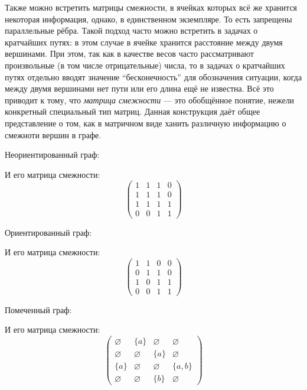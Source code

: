 Также можно встретить матрицы смежности, в ячейках которых всё же хранится некоторая информация, однако, в единственном экземпляре. То есть запрещены параллельные рёбра.
Такой подход часто можно встретить в задачах о кратчайших путях: в этом случае в ячейке хранится расстояние между двумя вершинами.
При этом, так как в качестве весов часто рассматривают произвольные (в том числе отрицательные) числа, то в задачах о кратчайших путях отдельно вводят значение ``бесконечность'' для обозначения ситуации, когда между двумя вершинами нет пути или его длина ещё не известна.
Всё это приводит к тому, что \textit{матрица смежности} --- это обобщённое понятие, нежели конкретный специальный тип матриц.
Данная конструкция даёт общее представление о том, как в матричном виде ханить различную информацию о смежноти вершин в графе.

\begin{example}
  Неориентированный граф:
  \begin{center}
    
  \end{center}

  И его матрица смежности:
  $$
  \begin{pmatrix}
    1 & 1 & 1 & 0 \\
    1 & 1 & 1 & 0 \\
    1 & 1 & 1 & 1 \\
    0 & 0 & 1 & 1
  \end{pmatrix}
  $$
\end{example}

\begin{example}\label{example:diGraph}
  Ориентированный граф:
  \begin{center}
  
  \end{center}

  И его матрица смежности:
  $$
  \begin{pmatrix}
    1 & 1 & 0 & 0 \\
    0 & 1 & 1 & 0 \\
    1 & 0 & 1 & 1 \\
    0 & 0 & 1 & 1
  \end{pmatrix}
  $$
\end{example}

\begin{example}
  Помеченный граф:
  \begin{center}
    
  \end{center}

  И его матрица смежности:
  $$
  \begin{pmatrix}
    \varnothing   & \{a\}       & \varnothing & \varnothing \\
    \varnothing   & \varnothing & \{a\}       & \varnothing \\
    \{a\}         & \varnothing & \varnothing & \{a,b\} \\
    \varnothing   & \varnothing & \{b\}       & \varnothing
  \end{pmatrix}
  $$
\end{example}

